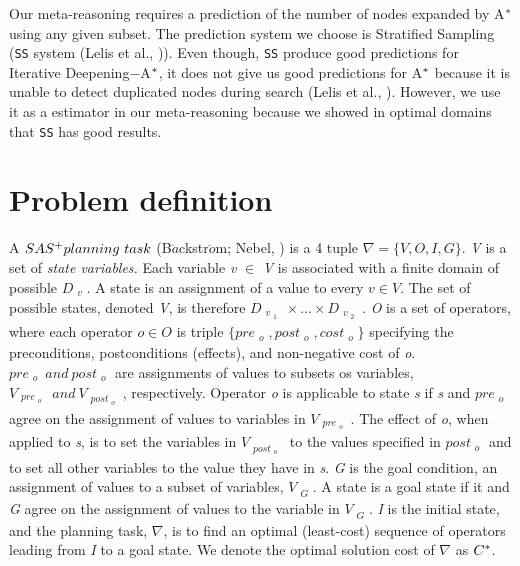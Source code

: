 Our meta-reasoning requires a prediction of the number of nodes expanded by A$\sp{*}$ using any given subset. The prediction system we choose is Stratified Sampling (\texttt{SS} system (Lelis et al., \citeyear{lelis2013predicting})). Even though, \texttt{SS} produce good predictions for Iterative Deepening$-$A$\sp{*}$, it does not give us good predictions for A$\sp{*}$ because it is unable to detect duplicated nodes during search (Lelis et al., \citeyear{lelis2014estimating}). However, we use it as a estimator in our meta-reasoning because we showed in optimal domains that \texttt{SS} has good results.

\section{Problem definition}

A $SAS\sp{+} planning\ task$ (B$\ddot{a}$ckstr$\ddot{o}$m; Nebel, \citeyear{backstrom1995complexity}) is a 4 tuple $\nabla = \{V, O, I, G\}.$ \textit{V} is a set of \textit{state variables.} Each variable \textit{v} $\in$ \textit{V} is associated with a finite domain of possible $D_{\substack{v}}$. A state is an assignment of a value to every $v \in V.$ The set of possible states, denoted \textit{V}, is therefore $D_{\substack{v_{\substack{1}}}}    \times ... \times D_{\substack{v_{\substack{2}}}}$. \textit{O} is a set of operators, where each operator $o \in O$ is triple $\{pre_{\substack{o}} , post_{\substack{o}}, cost_{\substack{o}}\}$ specifying the preconditions, postconditions (effects), and non-negative cost of \textit{o}. $pre_{\substack{o}}\ and\ post_{\substack{o}}$ are assignments of values to subsets os variables, $V_{\substack{pre_{\substack{o}}}}\ and\ V_{\substack{post_{\substack{o}}}}$, respectively. Operator \textit{o} is applicable to state \textit{s} if \textit{s} and $pre_{\substack{o}}$ agree on the assignment of values to variables in $V_{\substack{pre_{\substack{o}}}}$. The effect of \textit{o}, when applied to \textit{s}, is to set the variables in $V_{\substack{post_{\substack{o}}}}$ to the values specified in $post_{\substack{o}}$ and to set all other variables to the value they have in \textit{s}. \textit{G} is the goal condition, an assignment of values to a subset of variables, $V_{\substack{G}}$. A state is a goal state if it and \textit{G} agree on the assignment of values to the variable in $V_{\substack{G}}$. \textit{I} is the initial state, and the planning task, $\nabla$, is to find an optimal (least-cost) sequence of operators leading from \textit{I} to a goal state. We denote the optimal solution cost of $\nabla$ as $C\sp{*}$. 

